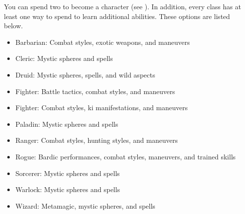         You can spend two  to become a  character (see ).
        In addition, every class has at least one way to spend  to learn additional abilities.
        These options are listed below.
        \begin{itemize}
            \item Barbarian: Combat styles, exotic weapons, and maneuvers
            \item Cleric: Mystic spheres and spells
            \item Druid: Mystic spheres, spells, and wild aspects
            \item Fighter: Battle tactics, combat styles, and maneuvers
            \item Fighter: Combat styles, ki manifestations, and maneuvers
            \item Paladin: Mystic spheres and spells
            \item Ranger: Combat styles, hunting styles, and maneuvers
            \item Rogue: Bardic performances, combat styles, maneuvers, and trained skills
            \item Sorcerer: Mystic spheres and spells
            \item Warlock: Mystic spheres and spells
            \item Wizard: Metamagic, mystic spheres, and spells
        \end{itemize}




